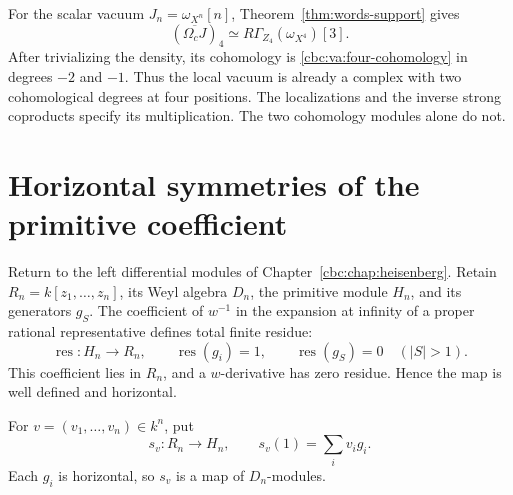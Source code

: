 For the scalar vacuum $J_n=\omega_{X^n}[n]$,
Theorem~\ref{thm:words-support} gives
\[
 (\overline{\Omega_cJ})_4
       \simeq R\Gamma_{Z_4}(\omega_{X^4})[3].
\]
After trivializing the density, its cohomology is
\eqref{cbc:va:four-cohomology} in degrees $-2$ and $-1$.
Thus the local vacuum is already a complex with two
cohomological degrees at four positions. The localizations
and the inverse strong coproducts specify its multiplication.
The two cohomology modules alone do not.

\section{Horizontal symmetries of the primitive coefficient}
\label{cbc:va:rigidity}

Return to the left differential modules of
Chapter~\ref{cbc:chap:heisenberg}. Retain
$R_n=k[z_1,\ldots,z_n]$, its Weyl algebra $D_n$, the
primitive module $H_n$, and its generators $g_S$.
The coefficient of $w^{-1}$ in the expansion at infinity
of a proper rational representative defines total finite residue:
\[
 \operatorname{res}:H_n\longrightarrow R_n,
 \qquad \operatorname{res}(g_i)=1,\qquad
 \operatorname{res}(g_S)=0\quad(|S|>1).
\]
This coefficient lies in $R_n$, and a $w$-derivative
has zero residue. Hence the map is well defined and horizontal.

For $v=(v_1,\ldots,v_n)\in k^n$, put
\[
 s_v:R_n\longrightarrow H_n,\qquad
 s_v(1)=\sum_i v_i g_i.
\]
Each $g_i$ is horizontal, so $s_v$ is a map of $D_n$-modules.

